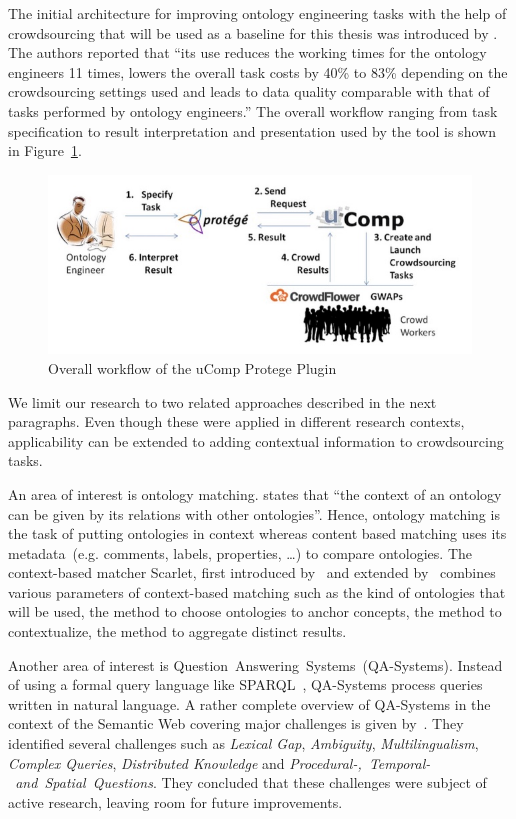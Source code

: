\documentclass[12pt, notitlepage]{article}
\begin{document}
The initial architecture for improving ontology engineering tasks with the help of crowdsourcing that will be used as a baseline for this thesis was introduced by \citet{wohlgenannt2016crowd}. The authors reported that \enquote{its use reduces the working times for the ontology engineers 11 times, lowers the overall task costs by 40\% to 83\% depending on the crowdsourcing settings used and leads to data quality comparable with that of tasks performed by ontology engineers.} The overall workflow ranging from task specification to result interpretation and presentation used by the tool is shown in Figure~\ref{fig:ucomp_workflow}.
\begin{figure}[H]
	 \includegraphics[width=\textwidth]{graphics/ucomp_workflow}
	 \caption{Overall workflow of the uComp Protege Plugin~\cite{wohlgenannt2016crowd}}\label{fig:ucomp_workflow}
\end{figure}

We limit our research to two related approaches described in the next paragraphs. Even though these were applied in different research contexts, applicability can be extended to adding contextual information to crowdsourcing tasks.

An area of interest is ontology matching. \citet{hoffmann2010context} states that \enquote{the context of an ontology can be given by its relations with other ontologies}. Hence, ontology matching is the task of putting ontologies in context whereas content based matching uses its metadata~(e.g. comments, labels, properties, \ldots) to compare ontologies. The context-based matcher Scarlet, first introduced by~\citet{sabou2008scarlet} and extended by~\citet{hoffmann2010context} combines various parameters of context-based matching such as the kind of ontologies that will be used, the method to choose ontologies to anchor concepts, the method to contextualize, the method to aggregate distinct results. 

Another area of interest is Question~Answering~Systems~(QA-Systems). Instead of using a formal query language like SPARQL~\cite{harris2013sparql}, QA-Systems process queries written in natural language. A rather complete overview of QA-Systems in the context of the Semantic Web covering major challenges is given by~\citet{hoffner2016survey}. They identified several challenges such as \emph{Lexical Gap}, \emph{Ambiguity}, \emph{Multilingualism}, \emph{Complex Queries}, \emph{Distributed Knowledge} and \emph{Procedural-,~Temporal-~and~Spatial~Questions}. They concluded that these challenges were subject of active research, leaving room for future improvements. 
\end{document}
